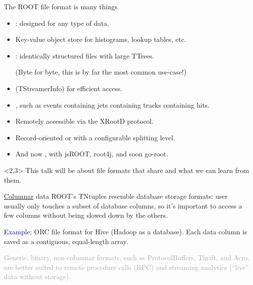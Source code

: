 \documentclass{beamer}
\begin{document}
\begin{frame}{The ROOT file format is many things}
\begin{itemize}\setlength{\itemsep}{0.2 cm}
\item {}: designed for any type of data.

\item Key-value object store for histograms, lookup tables, etc.

\item {}: identically structured files with large TTrees.

(Byte for byte, this is by far the most common use-case!)

\item {} (TStreamerInfo) for efficient access.

\item {}, such as events containing jets containing tracks containing hits.

\item Remotely accessible via the XRootD protocol.

\item Record-oriented or  with a configurable splitting level.

\item And now , with jsROOT, root4j, and soon go-root.
\end{itemize}

\begin{uncoverenv}<2,3>
\vspace{0.3 cm}
This talk will be about file formats that share  and what we can learn from them. 
\end{uncoverenv}
\end{frame}

\begin{frame}{\underline{Columnar} data}
\vspace{0.5 cm}
ROOT's TNtuples resemble database storage formats: user usually only touches a subset of database columns, so it's important to access a few columns without being slowed down by the others.

\vspace{0.3 cm}
\textcolor{darkblue}{Example:} ORC file format for Hive (Hadoop as a database). Each data column is saved as a contiguous, equal-length array.

\vspace{0.75 cm}
\textcolor{darkgray}{Generic, binary, non-columnar formats, such as ProtocolBuffers, Thrift, and Avro, are better suited to remote procedure calls (RPC) and streaming analytics (``live'' data without storage).}
\end{frame}
\end{document}
